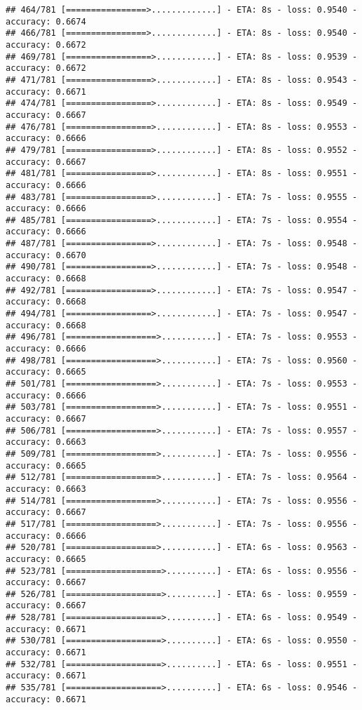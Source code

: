 \documentclass[
]{article}
\begin{document}
\begin{verbatim}
## 464/781 [================>.............] - ETA: 8s - loss: 0.9540 - accuracy: 0.6674
## 466/781 [================>.............] - ETA: 8s - loss: 0.9540 - accuracy: 0.6672
## 469/781 [=================>............] - ETA: 8s - loss: 0.9539 - accuracy: 0.6672
## 471/781 [=================>............] - ETA: 8s - loss: 0.9543 - accuracy: 0.6671
## 474/781 [=================>............] - ETA: 8s - loss: 0.9549 - accuracy: 0.6667
## 476/781 [=================>............] - ETA: 8s - loss: 0.9553 - accuracy: 0.6666
## 479/781 [=================>............] - ETA: 8s - loss: 0.9552 - accuracy: 0.6667
## 481/781 [=================>............] - ETA: 8s - loss: 0.9551 - accuracy: 0.6666
## 483/781 [=================>............] - ETA: 7s - loss: 0.9555 - accuracy: 0.6666
## 485/781 [=================>............] - ETA: 7s - loss: 0.9554 - accuracy: 0.6666
## 487/781 [=================>............] - ETA: 7s - loss: 0.9548 - accuracy: 0.6670
## 490/781 [=================>............] - ETA: 7s - loss: 0.9548 - accuracy: 0.6668
## 492/781 [=================>............] - ETA: 7s - loss: 0.9547 - accuracy: 0.6668
## 494/781 [=================>............] - ETA: 7s - loss: 0.9547 - accuracy: 0.6668
## 496/781 [==================>...........] - ETA: 7s - loss: 0.9553 - accuracy: 0.6666
## 498/781 [==================>...........] - ETA: 7s - loss: 0.9560 - accuracy: 0.6665
## 501/781 [==================>...........] - ETA: 7s - loss: 0.9553 - accuracy: 0.6666
## 503/781 [==================>...........] - ETA: 7s - loss: 0.9551 - accuracy: 0.6667
## 506/781 [==================>...........] - ETA: 7s - loss: 0.9557 - accuracy: 0.6663
## 509/781 [==================>...........] - ETA: 7s - loss: 0.9556 - accuracy: 0.6665
## 512/781 [==================>...........] - ETA: 7s - loss: 0.9564 - accuracy: 0.6663
## 514/781 [==================>...........] - ETA: 7s - loss: 0.9556 - accuracy: 0.6667
## 517/781 [==================>...........] - ETA: 7s - loss: 0.9556 - accuracy: 0.6666
## 520/781 [==================>...........] - ETA: 6s - loss: 0.9563 - accuracy: 0.6665
## 523/781 [===================>..........] - ETA: 6s - loss: 0.9556 - accuracy: 0.6667
## 526/781 [===================>..........] - ETA: 6s - loss: 0.9559 - accuracy: 0.6667
## 528/781 [===================>..........] - ETA: 6s - loss: 0.9549 - accuracy: 0.6671
## 530/781 [===================>..........] - ETA: 6s - loss: 0.9550 - accuracy: 0.6671
## 532/781 [===================>..........] - ETA: 6s - loss: 0.9551 - accuracy: 0.6671
## 535/781 [===================>..........] - ETA: 6s - loss: 0.9546 - accuracy: 0.6671

\end{verbatim}
\end{document}
